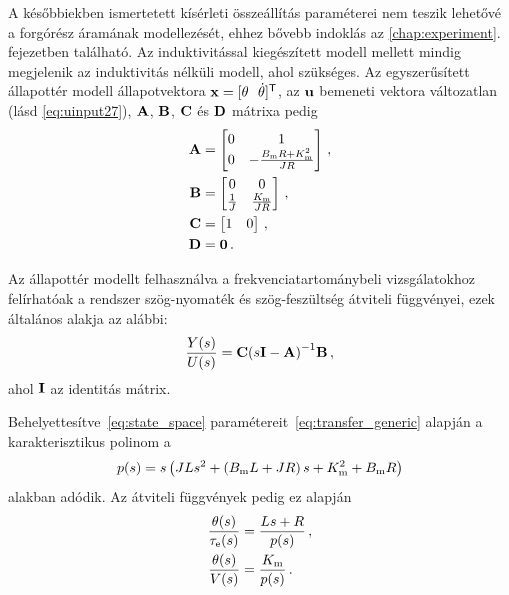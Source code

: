 A későbbiekben ismertetett kísérleti összeállítás paraméterei 
nem teszik lehetővé a forgórész áramának modellezését, ehhez bővebb indoklás az \ref{chap:experiment}.\,fejezetben található. 
%
Az induktivitással kiegészített modell mellett mindig megjelenik az 
induktivitás nélküli modell, ahol szükséges. 
%
Az egyszerűsített állapottér modell állapotvektora 
\(\mathbf{x} = [\theta~~\dot \theta]^{\mathsf T}\), az \(\mathbf{u}\) bemeneti vektora változatlan (lásd \eqref{eq:uinput27}), 
\(\mathbf{A}\), \(\mathbf{B}\), \(\mathbf{C}\) és \(\mathbf{D}\) mátrixa pedig 
%
\begin{equation}\label{eq:state_space_reduced}
    \begin{split}
        \mathbf{A} &= 
        \begin{bmatrix}
            0 & 1 \\
            0 & -\frac{B_{\mathrm{m}} R + K^2_{\mathrm{m}}}{JR} \\
        \end{bmatrix}\,,\\
        \mathbf{B} &=
        \begin{bmatrix}
            0 & 0 \\
            \frac{1}{J} & \frac{K_{\mathrm{m}}}{JR} \\
        \end{bmatrix}\,,\\
        \mathbf{C} &=
        \begin{bmatrix}
            1 & 0 \\
        \end{bmatrix}\,,\\
        \mathbf{D} &= \mathbf{0}\,.
    \end{split}
\end{equation}

Az állapottér modellt felhasználva a frekvenciatartománybeli vizsgálatokhoz felírhatóak a rendszer 
szög-nyomaték és szög-feszültség átviteli függvényei, ezek általános alakja az alábbi:
\begin{align}\label{eq:transfer_generic}
    \frac{Y(s)}{U(s)} = \mathbf{C}{\left(s \mathbf{I} - \mathbf{A}\right)}^{-1} \mathbf{B}\,,
\end{align}
ahol $\mathbf{I}$ az identitás mátrix.

Behelyettesítve~\eqref{eq:state_space} 
paramétereit~\eqref{eq:transfer_generic} alapján a karakterisztikus polinom a
\begin{align}\label{eq:characteristic_polynomial}
    p(s) = s\left(JLs^2 + \left(B_{\mathrm{m}} L + JR\right)s + K_{\mathrm{m}}^2 + B_{\mathrm{m}} R\right)
\end{align}
alakban adódik. Az átviteli függvények pedig ez alapján
\begin{equation}\label{eq:transfer_function}
    \begin{split}
        \frac{\theta(s)}{\tau_{\mathrm{e}}(s)} &= \frac{Ls + R}{p(s)}\,,\\
        \frac{\theta(s)}{V(s)} &= \frac{K_{\mathrm{m}}}{p(s)}\,.
    \end{split}
\end{equation}

